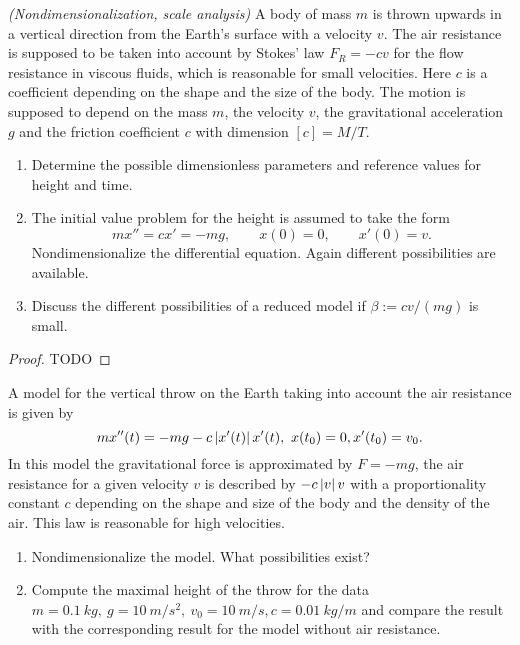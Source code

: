 \begin{ex}
  \textit{(Nondimensionalization, scale analysis)} A body of mass $m$ is thrown
  upwards in a vertical direction from the Earth’s surface with a velocity $v$.
  The air resistance is supposed to be taken into account by Stokes' law $F_R =
  -cv$ for the flow resistance in viscous fluids, which is reasonable for small
  velocities. Here $c$ is a coefficient depending on the shape and the size of
  the body. The motion is supposed to depend on the mass $m$, the velocity $v$,
  the gravitational acceleration $g$ and the friction coefficient $c$ with
  dimension $[c] = M/T$.

  \begin{enumerate}
    \item Determine the possible dimensionless parameters and reference values
      for height and time.
    \item The initial value problem for the height is assumed to take the form
      \[
      m x'' = c x' = -m g,\qquad x(0) = 0,\qquad x'(0) = v.
      \]
      Nondimensionalize the differential equation. Again different
      possibilities are available.
    \item Discuss the different possibilities of a reduced model if $\beta :=
      cv / (m g)$ is small.
  \end{enumerate}
\end{ex}

\begin{proof}
  TODO
\end{proof}



\begin{ex}
  [1.6]
  \label{ex:1.6}

  A model for the vertical throw on the Earth taking into account the air
  resistance is given by
  \[
    mx''(t) = -mg  - c\left\vert{x'(t)}\right\vert x'(t),\ x(t_0) = 0, x'(t_0) = v_0.
  \]
  In this model the gravitational force is approximated by $F = -mg$, the air
  resistance for a given velocity $v$ is described by $-c\left\vert{v}\right\vert v$ with a
  proportionality constant $c$ depending on the shape and size of the body and
  the density of the air. This law is reasonable for high velocities.
  \begin{enumerate}
    \item Nondimensionalize the model. What possibilities exist?
    \item Compute the maximal height of the throw for the data $m =
      \SI{0.1}{kg},\ g = \SI{10}{m\per s^2},\ v_0 = \SI{10}{m \per s}, c =
      \SI{0.01}{kg\per m}$ and compare the result with the corresponding result
      for the model without air resistance.
  \end{enumerate}
  
\end{ex}


